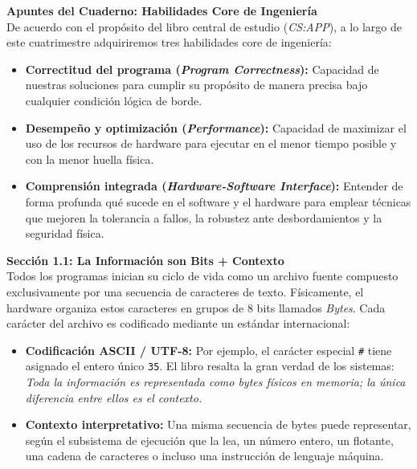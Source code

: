 \documentclass[11pt, a4paper]{article}
\begin{document}
\noindent\textbf{Apuntes del Cuaderno: Habilidades Core de Ingeniería}\\[0.5em]
De acuerdo con el propósito del libro central de estudio (\textit{CS:APP}), a lo largo de este cuatrimestre adquiriremos tres habilidades core de ingeniería:
\begin{itemize}
  \item \textbf{Correctitud del programa (\textit{Program Correctness}):} Capacidad de nuestras soluciones para cumplir su propósito de manera precisa bajo cualquier condición lógica de borde.
  \item \textbf{Desempeño y optimización (\textit{Performance}):} Capacidad de maximizar el uso de los recursos de hardware para ejecutar en el menor tiempo posible y con la menor huella física.
  \item \textbf{Comprensión integrada (\textit{Hardware-Software Interface}):} Entender de forma profunda qué sucede en el software y el hardware para emplear técnicas que mejoren la tolerancia a fallos, la robustez ante desbordamientos y la seguridad física.
\end{itemize}

\noindent\textbf{Sección 1.1: La Información son Bits + Contexto}\\[0.5em]
Todos los programas inician su ciclo de vida como un archivo fuente compuesto exclusivamente por una secuencia de caracteres de texto. Físicamente, el hardware organiza estos caracteres en grupos de 8 bits llamados \textit{Bytes}. Cada carácter del archivo es codificado mediante un estándar internacional:
\begin{itemize}
  \item \textbf{Codificación ASCII / UTF-8:} Por ejemplo, el carácter especial \texttt{\#} tiene asignado el entero único \texttt{35}. El libro resalta la gran verdad de los sistemas: \textit{Toda la información es representada como bytes físicos en memoria; la única diferencia entre ellos es el contexto.}
  \item \textbf{Contexto interpretativo:} Una misma secuencia de bytes puede representar, según el subsistema de ejecución que la lea, un número entero, un flotante, una cadena de caracteres o incluso una instrucción de lenguaje máquina.
\end{itemize}
\end{document}

